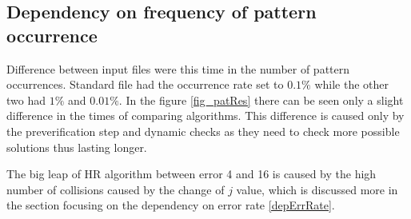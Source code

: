 \subsection{Dependency on frequency of pattern occurrence}
Difference between input files were this time in the number of pattern occurrences. Standard file had the occurrence rate set to $0.1 \%$ while the other two had $1 \%$ and $0.01 \%$. In the figure \ref{fig_patRes} there can be seen only a slight difference in the times of comparing algorithms. This difference is caused only by the preverification step and dynamic checks as they need to check more possible solutions thus lasting longer.

The big leap of HR algorithm between error 4 and 16 is caused by the high number of collisions caused by the change of $j$ value, which is discussed more in the section focusing on the dependency on error rate \ref{depErrRate}.

